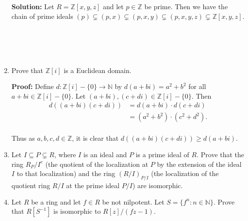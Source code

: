\documentclass{article}
\newcommand\TheSolution{%
  \textbf{Solution:} %
}
\newcommand\Proof{%
	\textbf{Proof:} %
}
\begin{document}
\begin{enumerate}
	\TheSolution Let $R=\mathbb{Z}[x,y,z]$ and let $p \in \mathbb{Z}$ be prime. Then we have the chain of prime ideals $(p) \subsetneq (p,x) \subsetneq (p,x,y) \subsetneq (p,x,y,z) \subsetneq \mathbb{Z}[x,y,z]$.\\
\\
\\
\\
\\
	
	\item Prove that $\mathbb{Z}[i]$ is a Euclidean domain.
	
	\Proof Define $d: \mathbb{Z}[i]-\{0\} \to \mathbb{N}$ by $d(a+bi)=a^2+b^2$ for all $a+bi \in \mathbb{Z}[i]-\{0\}$. Let $(a+bi),(c+di) \in \mathbb{Z}[i]-\{0\}$. Then	
	\[
		\begin{split}
			d((a+bi)(c+di))&=d(a+bi) \cdot d(c+di) \\
							&= (a^2+b^2) \cdot (c^2+d^2).\\
		\end{split}
	\]
	
	Thus as $a,b,c,d \in \mathbb{Z}$, it is clear that $d((a+bi)(c+di)) \geq d(a+bi).$
	
	
	
	\item Let $I \subseteq P \subsetneq R$, where $I$ is an ideal and $P$ is a prime ideal of $R$. Prove that the ring $R_P/I^e$ (the quotient of the localization at $P$ by the extension of the ideal $I$ to that localization) and the ring $(R/I)_{P/I}$ (the localization of the quotient ring $R/I$ at the prime ideal $P/I$) are isomorphic.
	
	\item Let $R$ be a ring and let $f \in R$ be not nilpotent. Let $S=\{f^n:n \in \mathbb{N}\}$. Prove that $R[S^{-1}]$ is isomorphic to $R[z]/(fz-1)$. 
\end{enumerate}
\end{document}
